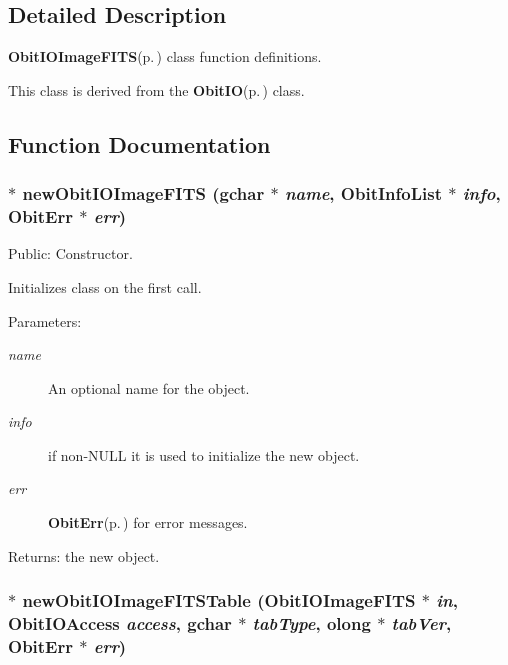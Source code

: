 \subsection{Detailed Description}
{\bf Obit\-IOImage\-FITS}{\rm (p.\,\pageref{structObitIOImageFITS})} class function definitions. 

This class is derived from the {\bf Obit\-IO}{\rm (p.\,\pageref{structObitIO})} class.

\subsection{Function Documentation}
\subsubsection{$\ast$ new\-Obit\-IOImage\-FITS (gchar $\ast$ {\em name}, {\bf Obit\-Info\-List} $\ast$ {\em info}, {\bf Obit\-Err} $\ast$ {\em err})}\label{ObitIOImageFITS_8c_a19}


Public: Constructor. 

Initializes class on the first call. \begin{Desc}
\item[Parameters:]
\begin{description}
\item[{\em name}]An optional name for the object. \item[{\em info}]if non-NULL it is used to initialize the new object. \item[{\em err}]{\bf Obit\-Err}{\rm (p.\,\pageref{structObitErr})} for error messages. \end{description}
\end{Desc}
\begin{Desc}
\item[Returns:]the new object. \end{Desc}
\subsubsection{$\ast$ new\-Obit\-IOImage\-FITSTable ({\bf Obit\-IOImage\-FITS} $\ast$ {\em in}, Obit\-IOAccess {\em access}, gchar $\ast$ {\em tab\-Type}, {\bf olong} $\ast$ {\em tab\-Ver}, {\bf Obit\-Err} $\ast$ {\em err})}\label{ObitIOImageFITS_8c_a34}


